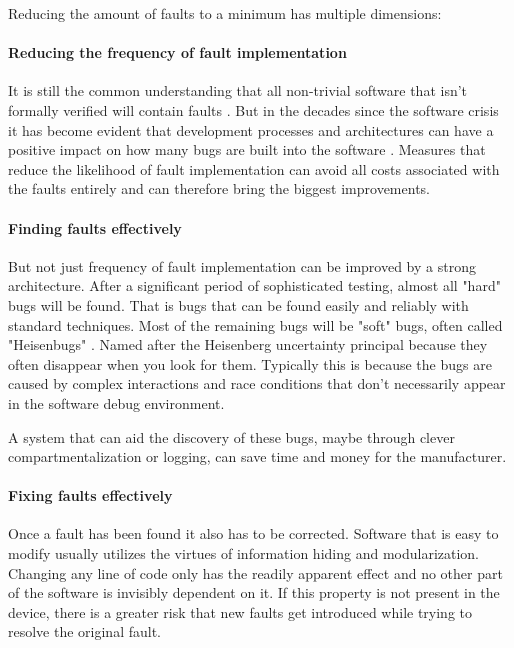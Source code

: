 Reducing the amount of faults to a minimum has multiple dimensions:
\paragraph{Reducing the frequency of fault implementation}
It is still the common understanding that all non-trivial software that isn't formally verified will contain faults \cite{klein2009sel4}\cite{Lipow.1982}. But in the decades since the software crisis it has become evident that development processes and architectures can have a positive impact on how many bugs are built into the software \cite{Randell.1996}.  Measures that reduce the likelihood of fault implementation can avoid all costs associated with the faults entirely and can therefore bring the biggest improvements. 
\paragraph{Finding faults effectively}
But not just frequency of fault implementation can be improved by a strong architecture. After a significant period of sophisticated testing, almost all "hard" bugs will be found. That is bugs that can be found easily and reliably with standard techniques. Most of the remaining bugs will be "soft" bugs, often called "Heisenbugs" \cite{Gray.1986}. Named after the Heisenberg uncertainty principal because they often disappear when you look for them. Typically this is because the bugs are caused by complex interactions and race conditions that don't necessarily appear in the software debug environment.

A system that can aid the discovery of these bugs, maybe through clever compartmentalization or logging, can save time and money for the manufacturer.
\paragraph{Fixing faults effectively}
Once a fault has been found it also has to be corrected. Software that is easy to modify usually utilizes the virtues of information hiding and modularization. Changing any line of code only has the readily apparent effect and no other part of the software is invisibly dependent on it. If this property is not present in the device, there is a greater risk that new faults get introduced while trying to resolve the original fault. 

